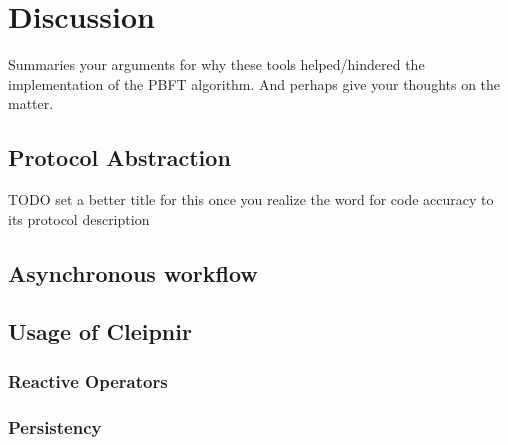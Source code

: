 \chapter{Discussion}
\label{chapter:Dis}
Summaries your arguments for why these tools helped/hindered the implementation of the PBFT algorithm. And perhaps give your thoughts on the matter.

\section{Protocol Abstraction}
TODO set a better title for this once you realize the word for code accuracy to its protocol description
\section{Asynchronous workflow}
\section{Usage of Cleipnir}
\subsection{Reactive Operators}
\subsection{Persistency}